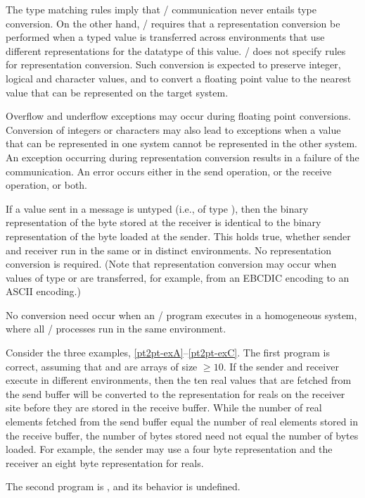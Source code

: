 The type matching rules imply that \MPI/ communication never entails type
conversion.  On the other hand, \MPI/ requires that a representation
conversion be
performed when a typed value is transferred across environments that use
different representations for the datatype of this value.
\MPI/ does not specify rules for representation conversion.  Such conversion is
expected to preserve integer, logical and character values, and to
convert a floating point value to the nearest value that can be
represented on the target system.

Overflow and underflow exceptions may occur during floating point conversions.
Conversion of integers or characters may also lead to exceptions when a value
that can be represented in one system cannot be represented in the other
system.  An exception
occurring during representation conversion results in a failure of the
communication. An error occurs either in the send operation, or the receive
operation, or both.

If a value sent in a message is untyped (i.e., of type ),
then the binary representation of the byte stored at the receiver is
identical to the binary representation of the byte loaded at the sender.  This
holds true, whether sender and receiver run in the same or in distinct
environments. No representation conversion is required.
(Note that representation conversion may
occur when values of type  or
 are transferred, for example, from an
EBCDIC encoding to an ASCII encoding.)

No conversion need occur when an \MPI/ program executes in
a homogeneous system, where all \MPI/ processes run in the same environment.


Consider the three examples, \ref{pt2pt-exA}--\ref{pt2pt-exC}.
The first program is correct, assuming that  and  are
 arrays of size $\ge 10$.
If the sender and receiver execute in different environments,
then the ten real values that are fetched from the send buffer will
be converted to the representation for reals on the receiver site
before they are stored in the receive buffer.  While the
number of real elements fetched from the send buffer equal the
number of real elements stored in the receive buffer, the number of
bytes stored need not equal the number of bytes loaded. For example, the
sender may use a four byte representation and the receiver an eight
byte representation for reals.

The second program is , and its behavior is undefined.

